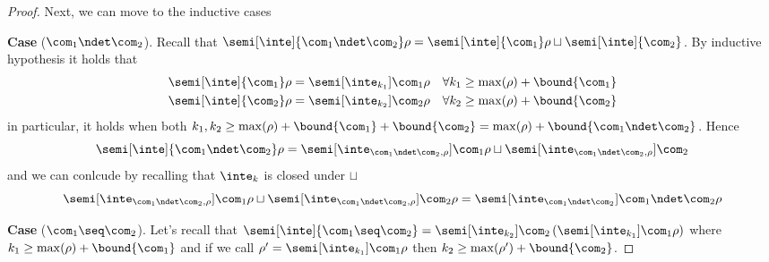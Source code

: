 \begin{proof}
  \medskip
  \noindent
  Next, we can move to the inductive cases
  
  \medskip
  
  \noindent
  \textbf{Case} (\(\com_1 \ndet \com_2\)).
  Recall that
  \({\semi[\inte]{\com_1 \ndet \com_2}\rho} =
  {\semi[\inte]{\com_1}\rho} \sqcup {\semi[\inte]{\com_2}}\). By
  inductive hypothesis it holds that
  \begin{align*}
    {\semi[\inte]{\com_1}\rho} & = \semi[\inte_{k_1}]{\com_1}\rho & \forall k_1 \geq \max(\rho) + \bound{\com_1} \\
    {\semi[\inte]{\com_2}\rho} & = \semi[\inte_{k_2}]{\com_2}\rho & \forall k_2 \geq \max(\rho) + \bound{\com_2}
  \end{align*}
  in particular, it holds when both
  \({k_1, k_2} \geq {\max(\rho) + \bound{\com_1} + \bound{\com_2}} =
  {\max(\rho) + \bound{\com_1 \ndet \com_2}}\). Hence
  \begin{equation*}
    {\semi[\inte]{\com_1 \ndet \com_2}\rho} = {\semi[\inte_{\com_1 \ndet \com_2, \rho}]{\com_1}\rho} \sqcup {\semi[\inte_{\com_1 \ndet \com_2, \rho}]{\com_2}}
  \end{equation*}
  and we can conlcude by recalling that \(\inte_k\) is closed under
  \(\sqcup\)
  \begin{equation*} {\semi[\inte_{\com_1 \ndet \com_2,
        \rho}]{\com_1}\rho} \sqcup {\semi[\inte_{\com_1 \ndet \com_2,
        \rho}]{\com_2}\rho} = {\semi[\inte_{\com_1\ndet\com_2}]{\com_1
        \ndet \com_2}\rho}
  \end{equation*}

  \medskip
  
  \noindent
  \textbf{Case} (\(\com_1 \seq \com_2\)).
  Let's recall that
  \(\semi[\inte]{\com_1 \seq \com_2} =
  \semi[\inte_{k_2}]{\com_2}\left({\semi[\inte_{k_1}]{\com_1}\rho}\right)\)
  where \(k_1 \geq \max(\rho) + \bound{\com_1}\) and if we call
  \(\rho' = {\semi[\inte_{k_1}]{\com_1}\rho}\) then
  \({k_2 \geq \max(\rho') + \bound{\com_2}}\).

  \medskip
  

\end{proof}
